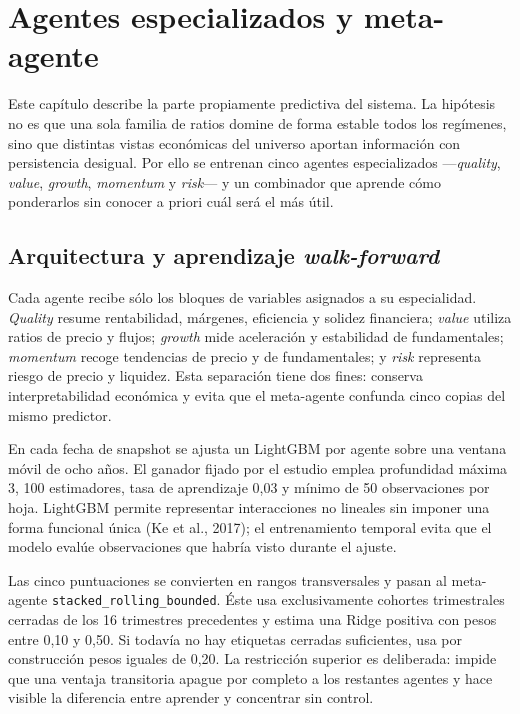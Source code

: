 \chapter{Agentes especializados y meta-agente}
\label{chap:agentes}

Este capítulo describe la parte propiamente predictiva del sistema. La hipótesis no es que una sola
familia de ratios domine de forma estable todos los regímenes, sino que distintas vistas económicas
del universo aportan información con persistencia desigual. Por ello se entrenan cinco agentes
especializados ---\textit{quality}, \textit{value}, \textit{growth}, \textit{momentum} y
\textit{risk}--- y un combinador que aprende cómo ponderarlos sin conocer a priori cuál será el
más útil.

\section{Arquitectura y aprendizaje \textit{walk-forward}}

Cada agente recibe sólo los bloques de variables asignados a su especialidad. \textit{Quality}
resume rentabilidad, márgenes, eficiencia y solidez financiera; \textit{value} utiliza ratios de
precio y flujos; \textit{growth} mide aceleración y estabilidad de fundamentales; \textit{momentum}
recoge tendencias de precio y de fundamentales; y \textit{risk} representa riesgo de precio y
liquidez. Esta separación tiene dos fines: conserva interpretabilidad económica y evita que el
meta-agente confunda cinco copias del mismo predictor.

En cada fecha de snapshot se ajusta un LightGBM por agente sobre una ventana móvil de ocho años.
El ganador fijado por el estudio emplea profundidad máxima 3, 100 estimadores, tasa de aprendizaje
0,03 y mínimo de 50 observaciones por hoja. LightGBM permite representar interacciones no lineales
sin imponer una forma funcional única (Ke et al., 2017); el entrenamiento temporal evita
que el modelo evalúe observaciones que habría visto durante el ajuste.

Las cinco puntuaciones se convierten en rangos transversales y pasan al meta-agente
\texttt{stacked\_rolling\_bounded}. Éste usa exclusivamente cohortes trimestrales cerradas de los
16 trimestres precedentes y estima una Ridge positiva con pesos entre 0,10 y 0,50. Si todavía no
hay etiquetas cerradas suficientes, usa por construcción pesos iguales de 0,20. La restricción
superior es deliberada: impide que una ventaja transitoria apague por completo a los restantes
agentes y hace visible la diferencia entre aprender y concentrar sin control.

